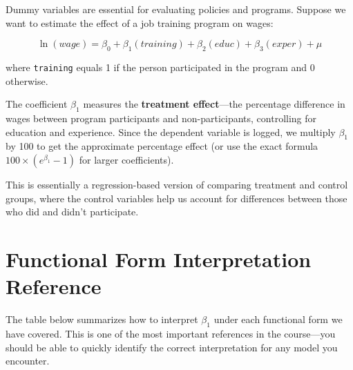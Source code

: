 \documentclass[
  letterpaper,
  DIV=11,
  numbers=noendperiod]{scrreprt}
\begin{document}
Dummy variables are essential for evaluating policies and programs.
Suppose we want to estimate the effect of a job training program on
wages:

\[
\ln(wage) = \beta_0 + \beta_1(training) + \beta_2(educ) + \beta_3(exper) + \mu
\]

where \texttt{training} equals 1 if the person participated in the
program and 0 otherwise.

The coefficient \(\beta_1\) measures the \textbf{treatment effect}---the
percentage difference in wages between program participants and
non-participants, controlling for education and experience. Since the
dependent variable is logged, we multiply \(\beta_1\) by 100 to get the
approximate percentage effect (or use the exact formula
\(100 \times (e^{\beta_1} - 1)\) for larger coefficients).

This is essentially a regression-based version of comparing treatment
and control groups, where the control variables help us account for
differences between those who did and didn't participate.

\section{Functional Form Interpretation
Reference}\label{functional-form-interpretation-reference}

The table below summarizes how to interpret \(\beta_1\) under each
functional form we have covered. This is one of the most important
references in the course---you should be able to quickly identify the
correct interpretation for any model you encounter.
\end{document}
